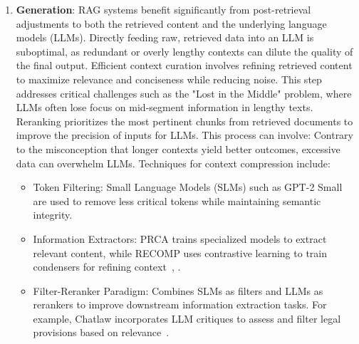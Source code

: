 \begin{enumerate}
{	      Dynamic pipelines (e.g., semantic or metadata-based routing) enhance adaptability for diverse scenarios.
	      Embedding in RAG is crucial for efficient retrieval based on similarity (e.g., cosine similarity) between the embedding of the question and document chunks, where the semantic representation capability of embedding models plays a key role.
	      This mainly includes a sparse encoder (BM25) and a dense retriever (BERT architecture Pre-training language models).
	      Advanced models like AngIE and Voyage leverage multi-task tuning to improve semantic representation and retrieval accuracy.

	      }

	\item {
	      \textbf{Generation}: RAG systems benefit significantly from post-retrieval adjustments to both the retrieved content and the underlying language models (LLMs). Directly feeding raw, retrieved data into an LLM is suboptimal, as redundant or overly lengthy contexts can dilute the quality of the final output.
	      Efficient context curation involves refining retrieved content to maximize relevance and conciseness while reducing noise. This step addresses critical challenges such as the "Lost in the Middle" problem, where LLMs often lose focus on mid-segment information in lengthy texts.
	      Reranking prioritizes the most pertinent chunks from retrieved documents to improve the precision of inputs for LLMs. This process can involve:
	      Contrary to the misconception that longer contexts yield better outcomes, excessive data can overwhelm LLMs. Techniques for context compression include:

	      \begin{itemize}
		      \item Token Filtering: Small Language Models (SLMs) such as GPT-2 Small are used to remove less critical tokens while maintaining semantic integrity.
		      \item Information Extractors: PRCA trains specialized models to extract relevant content, while RECOMP uses contrastive learning to train condensers for refining context~\cite{cheng2023lift}, \cite{wang2024bridging}.
		      \item Filter-Reranker Paradigm: Combines SLMs as filters and LLMs as rerankers to improve downstream information extraction tasks. For example, Chatlaw incorporates LLM critiques to assess and filter legal provisions based on relevance~\cite{ma2023query}.
	      \end{itemize}


}
\end{enumerate}
